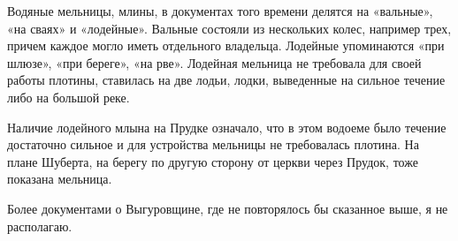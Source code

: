 Водяные мельницы, млины, в документах того времени делятся на «вальные», «на сваях» и «лодейные». Вальные состояли из нескольких колес, например трех, причем каждое могло иметь отдельного владельца. Лодейные упоминаются «при шлюзе», «при береге», «на рве». Лодейная мельница не требовала для своей работы плотины, ставилась на две лодьи, лодки, выведенные на сильное течение либо на большой реке.

Наличие лодейного млына на Прудке означало, что в этом водоеме было течение достаточно сильное и для устройства мельницы не требовалась плотина. На плане Шуберта, на берегу по другую сторону от церкви через Прудок, тоже показана мельница.

Более документами о Выгуровщине, где не повторялось бы сказанное выше, я не располагаю.
